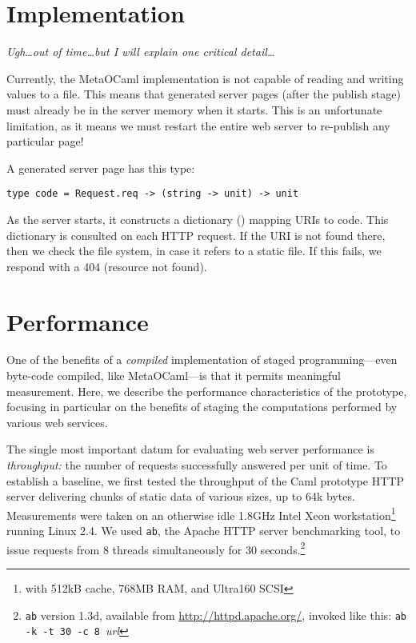 \documentclass[preprint]{acm_proc_article-sp}
\def\MOC{MetaOCaml}
\begin{document}
\section{Implementation}
\label{sec:impl}

\textit{Ugh\ldots out of time\ldots but I will explain one
  critical detail\ldots}

Currently, the \MOC{} implementation is not capable of reading
and writing  values to a file.  This means that
generated server pages (after the publish stage) must already be
in the server memory when it starts.  This is an unfortunate
limitation, as it means we must restart the entire web server to
re-publish any particular page!

A generated server page has this type:
\begin{lstlisting}[numbers=none]
  type code = Request.req -> (string -> unit) -> unit
\end{lstlisting}
As the server starts, it constructs a dictionary () mapping URIs to code.  This dictionary is
consulted on each HTTP request.  If the URI is not found there,
then we check the file system, in case it refers to a static
file.  If this fails, we respond with a 404 (resource not
found).


\section{Performance}
\label{sec:perf}

One of the benefits of a \emph{compiled} implementation of staged
programming---even byte-code compiled, like \MOC{}---is that it
permits meaningful measurement.  Here, we describe the performance
characteristics of the prototype, focusing in particular on the
benefits of staging the computations performed by various web
services.

The single most important datum for evaluating web server performance
is \textit{throughput:} the number of requests successfully answered
per unit of time.  To establish a baseline, we first tested the
throughput of the Caml prototype HTTP server delivering chunks of
static data of various sizes, up to 64k bytes.
Measurements were taken on an otherwise idle 1.8GHz Intel
Xeon\texttrademark{} workstation\footnote{with 512kB cache, 768MB RAM,
  and Ultra160 SCSI} running Linux 2.4.  We used \texttt{ab},
the Apache HTTP server benchmarking tool, to issue requests
from 8 threads simultaneously for 30 seconds.\footnote{\texttt{ab}
  version 1.3d, available from \url{http://httpd.apache.org/}, 
  invoked like this:
  \texttt{ab -k -t 30 -c 8 }\textit{url}}
\end{document}
